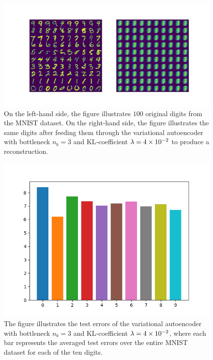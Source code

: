 \begin{figure}
\begin{center}
      \includegraphics[trim = 15mm 10mm 15mm 15mm, clip, width=\linewidth]{convolutional_VAE_snd_KL_4e-2_10k_epochs_3D_inference}
\end{center}
\caption{On the left-hand side, the figure illustrates $100$ original digits from the MNIST dataset. On the right-hand side, the figure illustrates the same digits after feeding them through the variational autoencoder with bottleneck $n_b=3$ and KL-coefficient $\lambda=\num{4e-2}$ to produce a reconstruction.}\label{fig:convolutional_VAE_snd_KL_4e-2_10k_epochs_3D_inference}
\end{figure}


\begin{figure}
\begin{center}
      \includegraphics[width=0.49\linewidth]{convolutional_VAE_snd_KL_4e-2_10k_epochs_3D_errors}
\end{center}
\caption{The figure illustrates the test errors of the variational autoencoder with bottleneck $n_b=3$ and KL-coefficient $\lambda = \num{4e-2}$, where each bar represents the averaged test errors over the entire MNIST dataset for each of the ten digits.}\label{fig:convolutional_VAE_snd_KL_4e-2_10k_epochs_3D_errors}
\end{figure}


